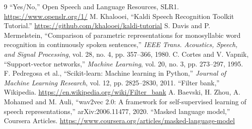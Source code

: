 \documentclass[11pt,a4paper]{article}
\begin{document}
\begingroup\small
\begin{thebibliography}{9}\setlength{\itemsep}{0pt}
 ``Yes/No,'' Open Speech and Language Resources, SLR1. \url{https://www.openslr.org/1/}
 M. Khalooei, ``Kaldi Speech Recognition Toolkit Tutorial.'' \url{https://github.com/khalooei/kaldi-tutorial}
 S. Davis and P. Mermelstein, ``Comparison of parametric representations for monosyllabic word recognition in continuously spoken sentences,'' \emph{IEEE Trans. Acoustics, Speech, and Signal Processing}, vol. 28, no. 4, pp. 357--366, 1980.
 C. Cortes and V. Vapnik, ``Support-vector networks,'' \emph{Machine Learning}, vol. 20, no. 3, pp. 273--297, 1995.
 F. Pedregosa et al., ``Scikit-learn: Machine learning in Python,'' \emph{Journal of Machine Learning Research}, vol. 12, pp. 2825--2830, 2011.
 ``Filter bank,'' Wikipedia. \url{https://en.wikipedia.org/wiki/Filter_bank}
 A. Baevski, H. Zhou, A. Mohamed and M. Auli, ``wav2vec 2.0: A framework for self-supervised learning of speech representations,'' arXiv:2006.11477, 2020.
 ``Masked language model,'' Coursera Articles. \url{https://www.coursera.org/articles/masked-language-model}
\end{thebibliography}
\endgroup
\end{document}
